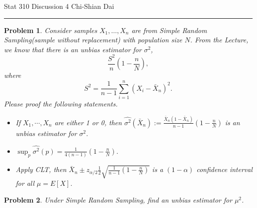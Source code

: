 \documentclass[12pt]{article}
\newtheorem{problem}{Problem}
\begin{document}
	\noindent Stat 310 \hfill  Discussion 4 \hfill Chi-Shian Dai
\smallskip
	\hrule

\begin{problem}
Consider samples $X_1,\dots,X_n$ are from Simple Random Sampling(sample without replacement) with population size  $N$. From the Lecture, we know that there is an unbias estimator for $\sigma^2$,
$$\frac{S^2}{n}(1-\frac{n}{N}),$$
where 
$$S^2=\frac{1}{n-1}\sum_{i=1}^{n} (X_i-\bar {X}_n)^2.$$
Please proof the following statements.
\begin{itemize}
	\item [(i)] If $X_1,\cdots, X_n$ are either 1 or 0, then
	$\hat{\sigma^2}(\bar{X}_n):=\frac{\bar{X}_n(1-\bar{X}_n)}{n-1}\left(1-\frac{n}{N}\right) 
	$ is an unbias estimator for $\sigma^2$.
	\item [(ii)] $\sup_p \hat{\sigma^2}(p)=\frac{1}{4(n-1)}\left(1-\frac{n}{N}\right) $.
	\item [(iii)]  Apply CLT, then
	$\bar{X}_n\pm z_{\alpha/2}\frac{1}{2}\sqrt{  \frac{1}{n-1}\left(1-\frac{n}{N}\right) }$ is a $(1-\alpha)$ confidence interval for all $\mu=E[X]$. 
\end{itemize}
\end{problem}
\vspace*{2\baselineskip}
\begin{problem}
	Under Simple Random Sampling, find an unbias estimator for $\mu^2$.
\end{problem}
\end{document}
